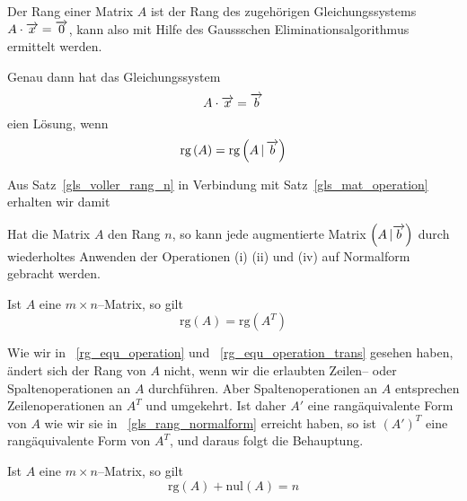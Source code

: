 \medbreak

\begin{korollar} Der Rang einer Matrix $A$ ist der Rang des zugehörigen 
Gleichungssystems $A \cdot \overrightarrow{x} = \overrightarrow{0}$, kann also mit Hilfe des 
Gau{ss}schen Eliminationsalgorithmus ermittelt werden.
\end{korollar}

\begin{korollar} Genau dann hat das Gleichungssystem 
  	$$ A \cdot \overrightarrow{x} = \overrightarrow{b} $$
eien Lösung, wenn
  	$$ \textrm{rg}\,(A) = \textrm{rg}\left(A \, \vert \, \overrightarrow{b}\right) $$
\end{korollar}

Aus Satz~\ref{gls_voller_rang_n} in Verbindung mit Satz~\ref{gls_mat_operation} 
erhalten wir damit

\begin{korollar}\label{gls_mat_operation_rang_n} Hat die Matrix $A$ den Rang $n$, 
so kann jede augmentierte Matrix $\left(A \, \vert \overrightarrow{b}\right)$ durch 
wiederholtes Anwenden der Operationen (i) (ii) und (iv) auf Normalform gebracht werden.
\end{korollar}


\begin{korollar}\label{gls_rang_transp} Ist $A$ eine $m \times n$--Matrix, so gilt
  	$$ \textrm{rg}(A) = \textrm{rg}(A^T) $$
\end{korollar}

\beweis Wie wir in ~\ref{rg_equ_operation} und ~\ref{rg_equ_operation_trans} gesehen haben, ändert sich 
der Rang von $A$ nicht, wenn wir die erlaubten Zeilen-- oder Spaltenoperationen an $A$ durchführen. Aber 
Spaltenoperationen an $A$ entsprechen Zeilenoperationen an $A^T$ und umgekehrt. Ist daher
$A'$ eine rangäquivalente Form von $A$ wie wir sie in ~\ref{gls_rang_normalform} erreicht haben, so ist 
$(A')^T$ eine rangäquivalente Form von $A^T$, und daraus folgt die Behauptung.

\begin{korollar}\label{gls_rangsatz} Ist $A$ eine $m \times n$--Matrix, so gilt
  	$$ \textrm{rg}(A) + \textrm{nul}(A) = n $$
\end{korollar}

